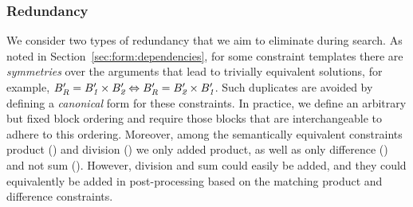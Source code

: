 %





\subsubsection{Redundancy}
We consider two types of redundancy that we aim to eliminate during search.
As noted in Section~\ref{sec:form:dependencies}, for some constraint templates there are \textit{symmetries} over the arguments that lead to trivially equivalent solutions, for example, $B_{\textit{R}}' = B_{\textit{1}}' \times B_{\textit{2}}' \Leftrightarrow B_{\textit{R}}' = B_{\textit{2}}' \times B_{\textit{1}}'$.
Such duplicates are avoided by defining a \textit{canonical} form for these constraints.
In practice, we define an arbitrary but fixed block ordering and require those blocks that are interchangeable to adhere to this ordering.
Moreover, among the semantically equivalent constraints product () and division () we only added product, as well as only difference () and not sum (). However, division and sum could easily be added, and they could equivalently be added in post-processing based on the matching product and difference constraints.


